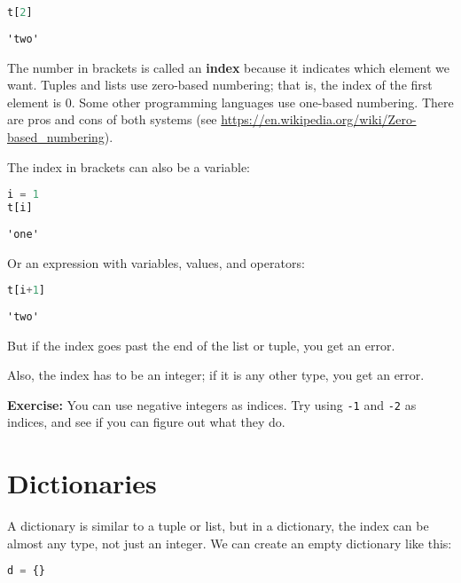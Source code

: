 \begin{lstlisting}[language=Python]
t[2]
\end{lstlisting}

\begin{lstlisting}[]
'two'
\end{lstlisting}

The number in brackets is called an \textbf{index} because it indicates
which element we want. Tuples and lists use zero-based numbering; that
is, the index of the first element is 0. Some other programming
languages use one-based numbering. There are pros and cons of both
systems (see \url{https://en.wikipedia.org/wiki/Zero-based_numbering}).

The index in brackets can also be a variable:

\begin{lstlisting}[language=Python]
i = 1
t[i]
\end{lstlisting}

\begin{lstlisting}[]
'one'
\end{lstlisting}

Or an expression with variables, values, and operators:

\begin{lstlisting}[language=Python]
t[i+1]
\end{lstlisting}

\begin{lstlisting}[]
'two'
\end{lstlisting}

But if the index goes past the end of the list or tuple, you get an
error.

Also, the index has to be an integer; if it is any other type, you get
an error.

\textbf{Exercise:} You can use negative integers as indices. Try using
\passthrough{\lstinline!-1!} and \passthrough{\lstinline!-2!} as
indices, and see if you can figure out what they do.

\hypertarget{dictionaries-1}{%
\section{Dictionaries}\label{dictionaries-1}}

A dictionary is similar to a tuple or list, but in a dictionary, the
index can be almost any type, not just an integer. We can create an
empty dictionary like this:

\begin{lstlisting}[language=Python]
d = {}
\end{lstlisting}

